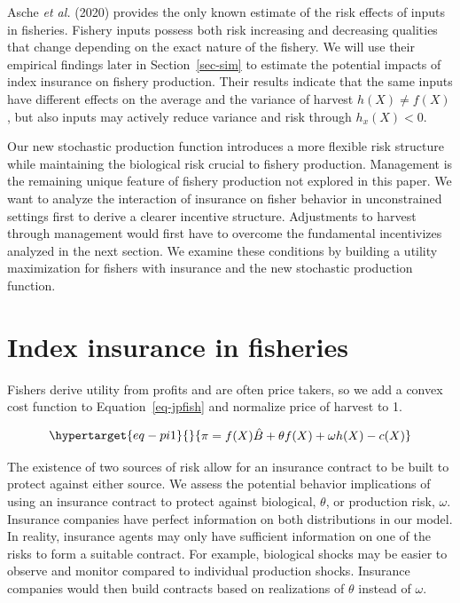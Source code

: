 \documentclass[
  letterpaper,
  DIV=11,
  numbers=noendperiod]{scrartcl}
\theoremstyle{plain}
\theoremstyle{plain}
\theoremstyle{remark}
\begin{document}
Asche \emph{et al.} (2020) provides the only known estimate of the risk
effects of inputs in fisheries. Fishery inputs possess both risk
increasing and decreasing qualities that change depending on the exact
nature of the fishery. We will use their empirical findings later in
Section~\ref{sec-sim} to estimate the potential impacts of index
insurance on fishery production. Their results indicate that the same
inputs have different effects on the average and the variance of harvest
\(h(X)\neq f(X)\), but also inputs may actively reduce variance and risk
through \(h_x(X)<0\).

Our new stochastic production function introduces a more flexible risk
structure while maintaining the biological risk crucial to fishery
production. Management is the remaining unique feature of fishery
production not explored in this paper. We want to analyze the
interaction of insurance on fisher behavior in unconstrained settings
first to derive a clearer incentive structure. Adjustments to harvest
through management would first have to overcome the fundamental
incentivizes analyzed in the next section. We examine these conditions
by building a utility maximization for fishers with insurance and the
new stochastic production function.

\hypertarget{sec-common}{%
\section{Index insurance in fisheries}\label{sec-common}}

Fishers derive utility from profits and are often price takers, so we
add a convex cost function to Equation~\ref{eq-jpfish} and normalize
price of harvest to 1.

\begin{equation}\protect\hypertarget{eq-pi1}{}{
\begin{aligned}
\pi=f(X)\hat{B}+\theta f(X)+\omega h(X)-c(X)
\end{aligned}
}\label{eq-pi1}\end{equation}

The existence of two sources of risk allow for an insurance contract to
be built to protect against either source. We assess the potential
behavior implications of using an insurance contract to protect against
biological, \(\theta\), or production risk, \(\omega\). Insurance
companies have perfect information on both distributions in our model.
In reality, insurance agents may only have sufficient information on one
of the risks to form a suitable contract. For example, biological shocks
may be easier to observe and monitor compared to individual production
shocks. Insurance companies would then build contracts based on
realizations of \(\theta\) instead of \(\omega\).
\end{document}
